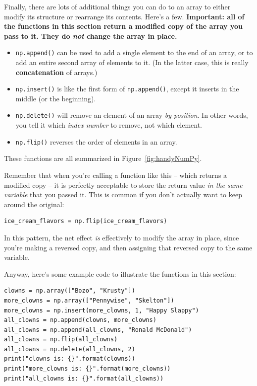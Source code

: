 Finally, there are lots of additional things you can do to an array to either
modify its structure or rearrange its contents. Here's a few.
\textbf{Important: all of the functions in this section return a modified copy
of the array you pass to it. They do \textit{not} change the array in place.}

\begin{itemize}
\itemsep.1em
\item \texttt{np.append()} can be used to add a single element to the end of an
array, or to add an entire second array of elements to it. (In the latter case,
this is really \textbf{concatenation} of arrays.)
\item \texttt{np.insert()} is like the first form of \texttt{np.append()},
except it inserts in the middle (or the beginning).
\item \texttt{np.delete()} will remove an element of an array \textit{by
position}. In other words, you tell it which \textit{index number} to remove,
not which element.
\item \texttt{np.flip()} reverses the order of elements in an array.
\end{itemize}

These functions are all summarized in Figure~\ref{fig:handyNumPy}.

Remember that when you're calling a function like this -- which returns a
modified copy -- it is perfectly acceptable to store the return value
\textit{in the same variable} that you passed it. This is common if you don't
actually want to keep around the original:

\begin{Verbatim}[fontsize=\small,samepage=true,frame=single,framesep=3mm]
ice_cream_flavors = np.flip(ice_cream_flavors)
\end{Verbatim}

In this pattern, the net effect \textit{is} effectively to modify the array in
place, since you're making a reversed copy, and then assigning that reversed
copy to the same variable.

Anyway, here's some example code to illustrate the functions in this section:

\begin{Verbatim}[fontsize=\small,samepage=true,frame=single,framesep=3mm]
clowns = np.array(["Bozo", "Krusty"])
more_clowns = np.array(["Pennywise", "Skelton"])
more_clowns = np.insert(more_clowns, 1, "Happy Slappy")
all_clowns = np.append(clowns, more_clowns)
all_clowns = np.append(all_clowns, "Ronald McDonald")
all_clowns = np.flip(all_clowns)
all_clowns = np.delete(all_clowns, 2)
print("clowns is: {}".format(clowns))
print("more_clowns is: {}".format(more_clowns))
print("all_clowns is: {}".format(all_clowns))
\end{Verbatim}

